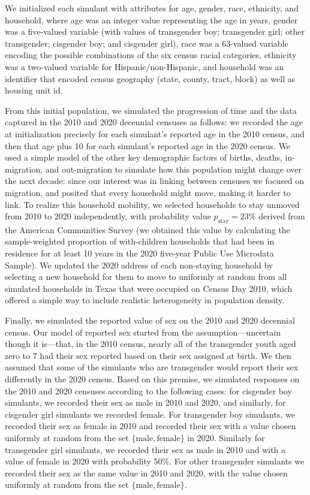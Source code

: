 \documentclass{jpc} %
\theoremstyle{plain}\newtheorem{satz}[thm]{Satz} %
\begin{document}
We initialized each simulant with attributes for age, gender, race, ethnicity, and household, where age was an integer value representing the age in years, gender was a five-valued variable (with values of transgender boy; transgender girl; other transgender; cisgender boy; and cisgender girl), race was a 63-valued variable encoding the possible combinations of the six census racial categories, ethnicity was a two-valued variable for Hispanic/non-Hispanic, and household was an identifier that encoded census geography (state, county, tract, block) as well as housing unit id.

From this initial population, we simulated the progression of time and the data captured in the 2010 and 2020 decennial censuses as follows: we recorded the age at initialization precisely for each simulant's reported age in the 2010 census, and then that age plus 10 for each simulant's reported age in the 2020 census.  We used a simple model of the other key demographic factors of births, deaths, in-migration, and out-migration to simulate how this population might change over the next decade: since our interest was in linking between censuses we focused on migration, and posited that every household might move, making it harder to link. To realize this household mobility, we selected households to stay unmoved from 2010 to 2020 independently, with probability value $p_{\text{stay}} = 23\%$ derived from the American Communities Survey (we obtained this value by calculating the sample-weighted proportion of with-children households that had been in residence for at least 10 years in the 2020 five-year Public Use Microdata Sample).  We updated the 2020 address of each non-staying household by selecting a new household for them to move to uniformly at random from all simulated households in Texas that were occupied on Census Day 2010, which offered a simple way to include realistic heterogeneity in population density.

Finally, we simulated the reported value of sex on the 2010 and 2020 decennial census. Our model of reported sex started from the assumption---uncertain though it is---that, in the 2010 census, nearly all of the transgender youth aged zero to 7 had their sex reported based on their sex assigned at birth. We then assumed that some of the simulants who are transgender would report their sex differently in the 2020 census.
Based on this premise, we simulated responses on the 2010 and 2020 censuses according to the following cases: for cisgender boy simulants, we recorded their sex as male in 2010 and 2020, and similarly, for cisgender girl simulants we recorded female.  For transgender boy simulants, we recorded their sex as female in 2010 and recorded their sex with a value chosen uniformly at random from the set $\{\text{male}, \text{female}\}$ in 2020.  Similarly for transgender girl simulants, we recorded their sex as male in 2010 and with a value of female in 2020 with probability 50\%.  For other transgender simulants we recorded their sex as the same value in 2010 and 2020, with the value chosen uniformly at random from the set $\{\text{male}, \text{female}\}$.
\end{document}

